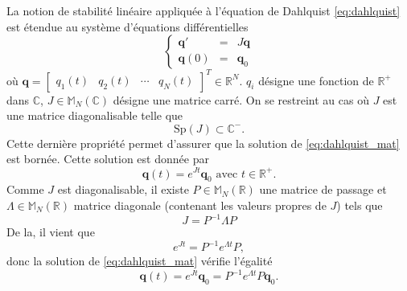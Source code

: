 La notion de stabilité linéaire appliquée à l'équation de Dahlquist \eqref{eq:dahlquist} est étendue au système d'équations différentielles
\begin{equation}
\left\lbrace
\begin{array}{rcl}
\mathbf{q}' & = & J \mathbf{q} \\
\mathbf{q}(0) & = & \mathbf{q}_0 
\end{array}
\right.
\label{eq:dahlquist_mat}
\end{equation}
où $\mathbf{q} = \begin{bmatrix}
q_1(t) & q_2(t) & \cdots & q_N(t)
\end{bmatrix}^T \in \mathbb{R}^N$.
$q_i$ désigne une fonction de $\mathbb{R}^+$ dans $\mathbb{C}$, $J \in \mathbb{M}_N (\mathbb{C})$ désigne une matrice carré. On se restreint au cas où $J$ est une matrice diagonalisable telle que 
\begin{equation}
\text{Sp}(J) \subset \mathbb{C}^-.
\end{equation}
Cette dernière propriété permet d'assurer que la solution de \eqref{eq:dahlquist_mat} est bornée. Cette solution est donnée par 
\begin{equation}
\mathbf{q}(t) = e^{Jt}\mathbf{q}_0 \text{ avec } t \in \mathbb{R}^+.
\end{equation}
Comme $J$ est diagonalisable, il existe $P \in \mathbb{M}_N(\mathbb{R})$ une matrice de passage et $\Lambda \in \mathbb{M}_N(\mathbb{R})$ matrice diagonale (contenant les valeurs propres de $J$) tels que
\begin{equation}
J = P^{-1}\Lambda P
\end{equation}
De la, il vient que 
\begin{equation}
e^{Jt} = P^{-1}e^{\Lambda t}P,
\end{equation}
donc la solution de \eqref{eq:dahlquist_mat} vérifie l'égalité 
\begin{equation}
\mathbf{q}(t) = e^{Jt}\mathbf{q}_0 = P^{-1}e^{\Lambda t}P\mathbf{q}_0.
\end{equation}

